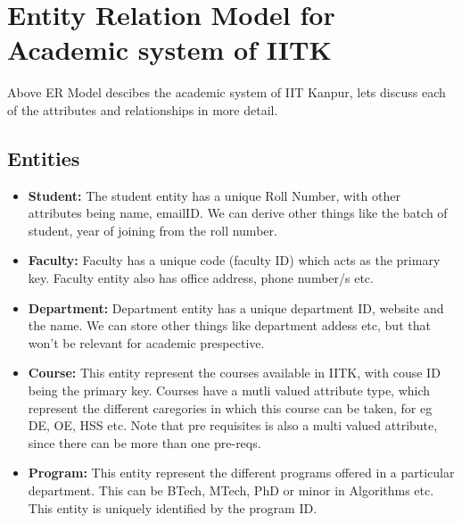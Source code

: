 \documentclass[a4paper]{article}
\begin{document}


\section*{Entity Relation Model for Academic system of IITK}
Above ER Model descibes the academic system of IIT Kanpur, lets discuss each of the attributes and relationships in more detail.

\subsection*{Entities}
\begin{itemize}
	\item{\textbf{Student:}} The student entity has a unique Roll Number, with other attributes being name, emailID.
	We can derive other things like the batch of student, year of joining from the roll number.
	\item{\textbf{Faculty:}} Faculty has a unique code (faculty ID) which acts as the primary key.
	Faculty entity also has office address, phone number/s etc.
	\item{\textbf{Department:}} Department entity has a unique department ID, website and the name.
	We can store other things like department addess etc, but that won't be relevant for academic prespective.
	\item{\textbf{Course:}} This entity represent the courses available in IITK, with couse ID being the primary key.
	Courses have a mutli valued attribute type, which represent the different caregories in which
	this course can be taken, for eg DE, OE, HSS etc. Note that pre requisites is also a multi valued attribute,
	since there can be more  than one pre-reqs.
	\item{\textbf{Program:}} This entity represent the different programs offered in a particular department.
	This can be BTech, MTech, PhD or minor in Algorithms etc. This entity is uniquely identified by the program ID.
\end{itemize}
\end{document}
